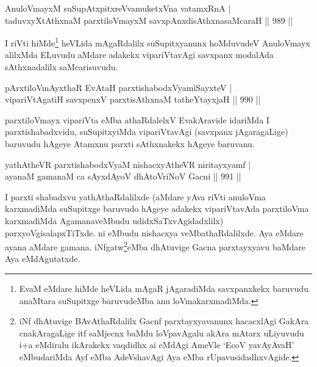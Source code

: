 \begin{shl}
AnuloVmayxM suSupAtxpitxreVvamuketxVna vatamxRnA | \\
taduvxyXtAthxnaM parxtiloVmayxM \footnotemark[2]savxpAnxdisAthxnasaMcaraH \hfill||   989 ||  
\end{shl}

\begin{artha}
I riVti hiMde\footnote{EvaM eMdare hiMde heVLida mAgaR jAgaradiMda savxpanxkekx baruvudu anaMtara suSupitxge baruvudeMba anu loVmakarxmadiMda.} heVLida mAgaRdalilx suSupitxyanunx hoMduvudeV AnuloVmayx alilxMda ELuvudu aMdare adakekx vipariVtavAgi savxpanx modalAda sAthxnadalilx saMcarisuvudu.
\end{artha}


\begin{shl}
pArxtiloVmAyxthaR EvAtaH parxtishabodxV\s yamiSayxteV | \\
vipariVtA\s \s gatiH savxpenxV \footnotemark[3]parxtisAthxnaM tatheYtayxjaH \hfill||  990 ||  
\end{shl}
\begin{artha}
parxtiloVmayx vipariVta eMba athaRdalelxV EvakAravide idariMda I parxtishabadxvidu, suSupitxyiMda vipariVtavAgi (savxpanx jAgaragaLige) baruvudu hAgeye Atamxnu parxti sAthxnakekx hAgeye baruvanu.
\end{artha}


\begin{shl}
yathAtheVR parxtishabodxV\s yaM nishacxyAtheVR niritayxyamf | \\
ayanaM gamanaM ca sAyxdAyoV dhAtoVriNoV Gacni \hfill||  991 ||  
\end{shl}

\begin{artha}
I parxti shabadxvu yathAthaRdalilxde (aMdare yAva riVti anuloVma karxmadiMda suSupitxge baruvudo hAgeye adakekx vipariVtavAda parxtiloVma karxmadiMda AgamanaveMbudu udidxSaTxvAgidadxlilx) parxyoVgisalapxTiTxde. ni eMbudu nishacxya veMbathaRdalilxde. Aya eMdare ayana aMdare gamana. iNfgatw\footnote{iNf dhAtuvige BAvAthaRdalilx Gacnf parxtayxyavanunx hacacxlAgi GakAra cnakAragaLige itf saMjecnx baMdu loVpavAgalu akAra mAtarx uLiyuvudu i+a eMdiralu ikArakekx vaqdidhx ai eMdAgi AmeVle `EcoV yavAyAvaH' eMbudariMda Ayf eMba AdeVshavAgi Aya eMba rUpavusidadhxvAgide.}eMba dhAtuvige Gacna parxtayxyavu baMdare Aya eMdAgutatxde.
\end{artha}

